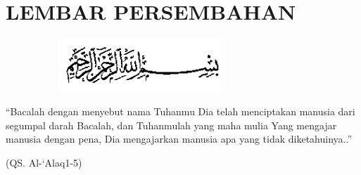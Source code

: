 %
%
%
%

\chapter*{LEMBAR PERSEMBAHAN}
\begin{figure}
	\centering
	\includegraphics [height=2cm, width=8cm]{konten/gambar/quran.png}
\end{figure}

“Bacalah dengan menyebut nama Tuhanmu
Dia telah menciptakan manusia dari segumpal darah
Bacalah, dan Tuhanmulah yang maha mulia
Yang mengajar manusia dengan pena, Dia mengajarkan manusia apa yang tidak diketahuinya..”

\begin{center}
	\centering (QS. Al-‘Alaq1-5)
\end{center}

